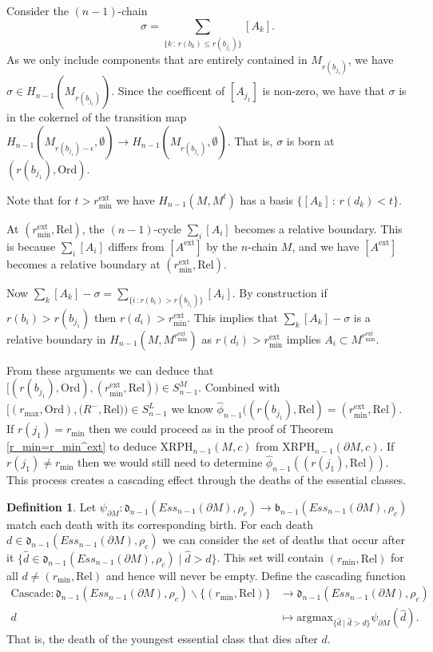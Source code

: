 \documentclass[a4paper,11pt]{article}
\theoremstyle{definition}
\newtheorem{defn}[theorem]{Definition}  \newtheorem{ex}[theorem]{Example}  \newtheorem{exs}[theorem]{Examples}  \newtheorem{question}[theorem]{Question}
\newcommand{\ext}{\text{ext}}
\newcommand{\argmax}{\text{argmax}}
\newcommand{\Cascade}{\text{Cascade}}
\begin{document}
Consider the $(n-1)$-chain 
$$\sigma=\sum_{\{k\,:\,r(b_k)\leq r(b_{j_1})\}}[A_k].$$ 
As we only include components that are entirely contained in $M_{r(b_{j_1})}$, we have $\sigma\in H_{n-1}(M_{r(b_{j_1})})$. Since the coefficent of $[A_{j_1}]$ is non-zero, we have that $\sigma$ is in the cokernel of the transition map $H_{n-1}(M_{r(b_{j_1})-\epsilon}, \emptyset)\to H_{n-1}(M_{r(b_{j_1})}, \emptyset)$. That is, $\sigma$ is born at $(r(b_{j_1}),\mathrm{Ord})$.

Note that for $t>r_{\min}^{\ext}$ we have $H_{n-1}(M, M^t)$ has a basis $\{[A_k]\,:\, r(d_k)<t\}$.


At $(r^\mathrm{ext}_{\min}, \mathrm{Rel})$, the $(n-1)$-cycle $\sum_i [A_i]$ becomes a relative boundary. This is because $\sum_i [A_i]$ differs from $[A^\mathrm{ext}]$ by the $n$-chain $M$, and we have $[A^\mathrm{ext}]$ becomes a relative boundary at $(r^\mathrm{ext}_{\min}, \mathrm{Rel})$. 

Now $\sum_k [A_k] - \sigma=\sum_{\{i\,:r(b_i) > r(b_{j_1})\}} [A_i]$. By construction if $r(b_i)> r(b_{j_1})$ then $r(d_i)>r_{\min}^{\ext}$. This implies that $\sum_k [A_k]-\sigma$ is a relative boundary in $H_{n-1}(M, M^{r_{\min}^{\ext}})$ as $r(d_i) > r^\mathrm{ext}_{\min}$ implies $A_i\subset M^{r^\mathrm{ext}_{\min}}$. 

From these arguments we can deduce that $[(r(b_{j_1}), \mathrm{Ord}), (r_{\min}^\mathrm{ext}, \mathrm{Rel}))\in S_{n-1}^{M}$. Combined with $[(r_{\max},\mathrm{Ord}),(R^-,\mathrm{Rel))} \in S_{n-1}^{L}$ we know  $\hat{\phi}_{n-1}((r(b_{j_1}),\mathrm{Rel})=(r_{\min}^\mathrm{ext},\mathrm{Rel})$. If $r(j_1)=r_{\min}$ then we could proceed as in the proof of Theorem \ref{r_min=r_min^ext} to deduce $\text{XRPH}_{n-1}(M, c)$ from $\text{XRPH}_{n-1}(\partial M, c)$. If $r(j_1)\neq r_{\min}$ then we would still need to determine $\hat{\phi}_{n-1}((r(j_1), \textrm{Rel}))$. This process creates a cascading effect through the deaths of the essential classes.


\begin{defn}\label{defn:cascade}
Let $\psi_{\partial M}: \mathfrak{d}_{n-1}(Ess_{n-1}(\partial M), \rho_c) \to \mathfrak{b}_{n-1}(Ess_{n-1}(\partial M), \rho_c)$ match each death with its corresponding birth.
For each death $d\in \mathfrak{d}_{n-1}(Ess_{n-1}(\partial M), \rho_c)$ we can consider the set of deaths that occur after it $\{\hat{d}\in \mathfrak{d}_{n-1}(Ess_{n-1}(\partial M), \rho_c)\mid \hat{d}>d\}$. This set will contain $(r_{\min}, \textrm{Rel})$ for all $d\neq (r_{\min}, \textrm{Rel})$ and hence will never be empty. Define the cascading function \begin{align*}
\Cascade: \mathfrak{d}_{n-1}(Ess_{n-1}(\partial M), \rho_c) \backslash \{(r_{\min}, \text{Rel})\}  & \to 
\mathfrak{d}_{n-1}(Ess_{n-1}(\partial M), \rho_c)\\  
d&\mapsto \argmax_{\{\hat{d}\mid \hat{d}> d\}} \psi_{\partial M}(\hat{d}).
\end{align*} That is, the death of the youngest essential class that dies after $d$.
\end{defn}
\end{document}
